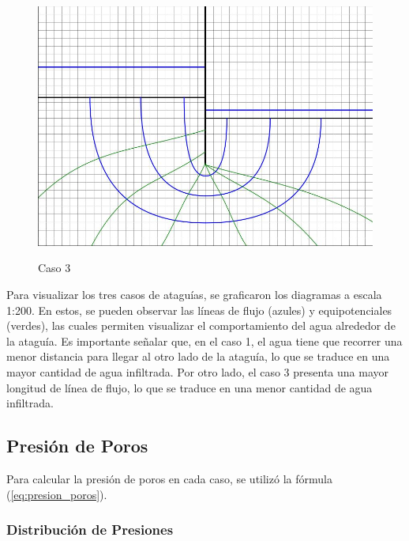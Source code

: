 \begin{figure}[H]
\begin{minipage}{0.32\textwidth}
        \includegraphics[width=\textwidth]{GRAFICOS/caso_3.jpg}
        \caption{Caso 3}
        \label{fig:caso_3}
    \end{minipage}
\end{figure}

Para visualizar los tres casos de ataguías, se graficaron los diagramas a escala 1:200. En estos, se pueden observar las líneas de flujo (azules) y equipotenciales (verdes), las cuales permiten visualizar el comportamiento del agua alrededor de la ataguía. Es importante señalar que, en el caso 1, el agua tiene que recorrer una menor distancia para llegar al otro lado de la ataguía, lo que se traduce en una mayor cantidad de agua infiltrada. Por otro lado, el caso 3 presenta una mayor longitud de línea de flujo, lo que se traduce en una menor cantidad de agua infiltrada.

\subsection{Presión de Poros}
Para calcular la presión de poros en cada caso, se utilizó la fórmula (\ref{eq:presion_poros}). 

\subsubsection{Distribución de Presiones}

